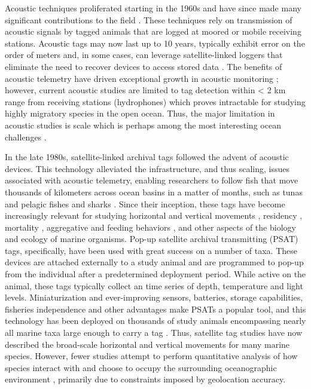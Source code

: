Acoustic techniques proliferated starting in the 1960s and have since made many significant contributions to the field \citep[\eg][]{Carey1981, Carey1990}. These techniques rely on transmission of acoustic signals by tagged animals that are logged at moored or mobile receiving stations. Acoustic tags may now last up to 10 years, typically exhibit error on the order of meters and, in some cases, can leverage satellite-linked loggers that eliminate the need to recover devices to access stored data \citep{Donaldson2014}. The benefits of acoustic telemetry have driven exceptional growth in acoustic monitoring \citep{Hussey2015}; however, current acoustic studies are limited to tag detection within < 2 km range from receiving stations (\eg hydrophones) which proves intractable for studying highly migratory species in the open ocean. Thus, the major limitation in acoustic studies is scale which is perhaps among the most interesting ocean challenges \citep{Stommel1963, Haury1978}. 

In the late 1980s, satellite-linked archival tags followed the advent of acoustic devices. This technology alleviated the \is infrastructure, and thus scaling, issues associated with acoustic telemetry, enabling researchers to follow fish that move thousands of kilometers across ocean basins in a matter of months, such as tunas \citep{Block2005} and pelagic fishes and sharks \citep[\eg][]{Block2011}. Since their inception, these tags have become increasingly relevant \citep{Hussey2015} for studying horizontal and vertical movements \citep{Block2011, Thorrold2014, Berumen2014}, residency \citep{Domeier2006}, mortality \citep{Musyl2011a}, aggregative and feeding behaviors \citep{Jorgensen2012}, and other aspects of the biology and ecology of marine organisms. Pop-up satellite archival transmitting (PSAT) tags, specifically, have been used with great success on a number of taxa. These devices are attached externally to a study animal and are programmed to pop-up from the individual after a predetermined deployment period. While active on the animal, these tags typically collect an \is time series of depth, temperature and light levels. Miniaturization and ever-improving sensors, batteries, storage capabilities, fisheries independence and other advantages make PSATs a popular tool, and this technology has been deployed on thousands of study animals encompassing nearly all marine taxa large enough to carry a tag \citep{Hussey2015}. Thus, satellite tag studies have now described the broad-scale horizontal and vertical movements for many marine species. However, fewer studies attempt to perform quantitative analysis of how species interact with and choose to occupy the surrounding oceanographic environment \citep[except see, for example,][]{Lawson2010}, primarily due to constraints imposed by geolocation accuracy.

